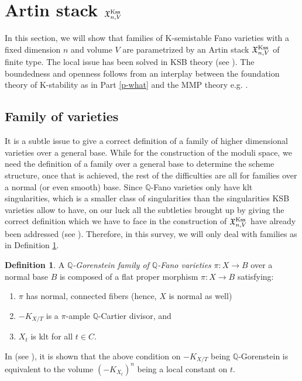 \documentclass[12pt,reqno]{amsart}%
\theoremstyle{definition}
\newtheorem{defn}[thm]{Definition}
\theoremstyle{remark}
\newcommand{\bQ}{{\mathbb{Q}}}
\newcommand{\Q}{{\mathbb{Q}}}
\begin{document}
\section{Artin stack $\mathfrak{X}^{\rm Kss}_{n,V}$}\label{s-ksemi}

In this section, we will show that families of K-semistable Fano varieties with a fixed dimension $n$ and volume $V$ are parametrized by an Artin stack  $\mathfrak{X}^{\rm Kss}_{n,V}$ of finite type. 
The local issue  has been solved in KSB theory (see \cite{Kol21}). The boundedness and openness follows from an interplay between the foundation theory of K-stability as in Part \ref{p-what} and the MMP theory e.g. \cite{HMX14, Bir19}.
\subsection{Family of varieties}
It is a subtle issue to give a correct definition of a family of higher dimensional varieties over a general base. 
While for the construction of the moduli space, we need the definition of a family over a general base to determine the scheme structure, once that is achieved, the rest of the difficulties are all for families over a normal (or even smooth) base. Since $\mathbb{Q}$-Fano varieties only have klt singularities, which is a smaller class of singularities than the singularities KSB varieties allow to have, on our luck all the subtleties brought up by giving the correct definition which we have to face in the construction  of $\mathfrak{X}^{\rm Kss}_{n,V}$ have already been addressed (see \cite{Kol08,Kol21}).
Therefore, in this survey, we will only deal with families as in Definition \ref{d-Qfamily}. 


\begin{defn}\label{d-Qfamily}
A \emph{$\Q$-Gorenstein family of  $\bQ$-Fano varieties} $\pi:X \to B$ over a normal base $B$ is composed of a flat proper morphism $\pi : X\to B$ satisfying: 
\begin{enumerate}
\item $\pi$ has normal, connected fibers (hence, $X$ is normal as well)
\item $-K_{X/T} $ is a $\pi$-ample $\Q$-Cartier divisor, and
\item $X_t$ is klt for all $t\in C$. 
\end{enumerate}
\end{defn}

In (see \cite[Theorem 11.6]{Kol16}), it is shown that the above condition on $-K_{X/T}$ being $\bQ$-Gorenstein is equivalent to the volume $(-K_{X_t})^n$ being a local constant on $t$. 
\end{document}

